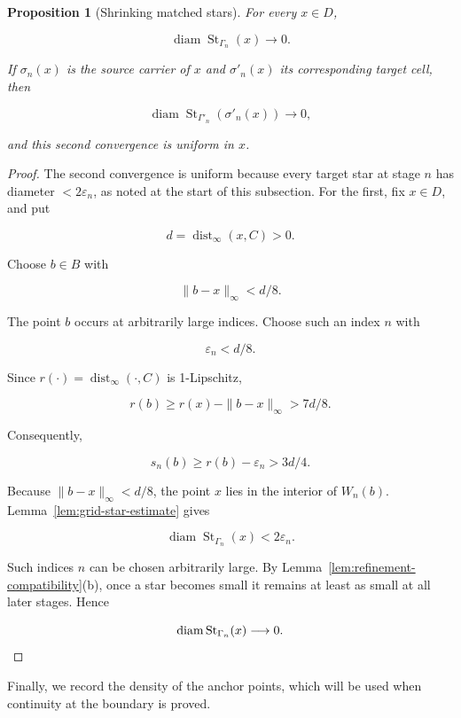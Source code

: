 \documentclass[11pt]{article}
\theoremstyle{mainplain}
\newtheorem{proposition}[theorem]{Proposition}
\theoremstyle{mainroman}
\theoremstyle{definition}
\numberwithin{equation}{section}
\begin{document}
\begin{proposition}[Shrinking matched stars]\label{prop:shrinking-stars}
For every \(x\in D\),

\[
\operatorname{diam}
 \operatorname{St}_{\Gamma_n}(x)
 \longrightarrow0.
\]

If \(\sigma_n(x)\) is the source carrier of \(x\) and \(\sigma'_n(x)\) its corresponding target cell, then

\[
\operatorname{diam}
 \operatorname{St}_{\Gamma'_n}(\sigma'_n(x))
 \longrightarrow0,
\]

and this second convergence is uniform in \(x\).
\end{proposition}
\begin{proof}
The second convergence is uniform because every target star at stage
\(n\) has diameter \(<2\varepsilon_n\), as noted at the start of this
subsection. For the first, fix \(x\in D\), and put

\[
d=\operatorname{dist}_\infty(x,C)>0.
\]

Choose \(b\in B\) with

\[
\|b-x\|_\infty<d/8.
\]

The point \(b\) occurs at arbitrarily large indices. Choose such an index \(n\) with

\[
\varepsilon_n<d/8.
\]

Since \(r(\cdot)=\operatorname{dist}_\infty(\cdot,C)\) is 1-Lipschitz,

\[
r(b)
 \ge r(x)-\|b-x\|_\infty
 >7d/8.
\]

Consequently,

\[
s_n(b)
 \ge r(b)-\varepsilon_n
 >3d/4.
\]

Because \(\|b-x\|_\infty<d/8\), the point \(x\) lies in the interior of \(W_n(b)\). Lemma~\ref{lem:grid-star-estimate} gives

\[
\operatorname{diam}
 \operatorname{St}_{\Gamma_n}(x)
 <2\varepsilon_n.
\]

Such indices \(n\) can be chosen arbitrarily large. By Lemma~\ref{lem:refinement-compatibility}\textup{(b)}, once a star becomes small it remains at least as small at all later stages. Hence

\[
\operatorname{diam}
 \operatorname{St}_{\Gamma_n}(x)
 \longrightarrow0. \qedhere
\]
\end{proof}

Finally, we record the density of the anchor points, which will be
used when continuity at the boundary is proved.
\end{document}
